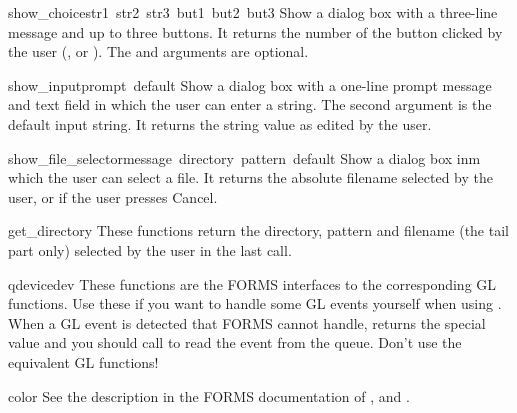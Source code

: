 \begin{funcdesc}{show_choice}{str1\, str2\, str3\, but1\, but2\, but3}
Show a dialog box with a three-line message and up to three buttons.
It returns the number of the button clicked by the user
(,  or ).
The  and  arguments are optional.
\end{funcdesc}

\begin{funcdesc}{show_input}{prompt\, default}
Show a dialog box with a one-line prompt message and text field in
which the user can enter a string.  The second argument is the default
input string.  It returns the string value as edited by the user.
\end{funcdesc}

\begin{funcdesc}{show_file_selector}{message\, directory\, pattern\, default}
Show a dialog box inm which the user can select a file.  It returns
the absolute filename selected by the user, or  if the user
presses Cancel.
\end{funcdesc}

\begin{funcdesc}{get_directory}{}
These functions return the directory, pattern and filename (the tail
part only) selected by the user in the last 
call.
\end{funcdesc}

\begin{funcdesc}{qdevice}{dev}
These functions are the FORMS interfaces to the corresponding GL
functions.  Use these if you want to handle some GL events yourself
when using .  When a GL event is detected that
FORMS cannot handle,  returns the special value
 and you should call  to read the
event from the queue.  Don't use the equivalent GL functions!
\end{funcdesc}

\begin{funcdesc}{color}{}
See the description in the FORMS documentation of ,
 and .
\end{funcdesc}


